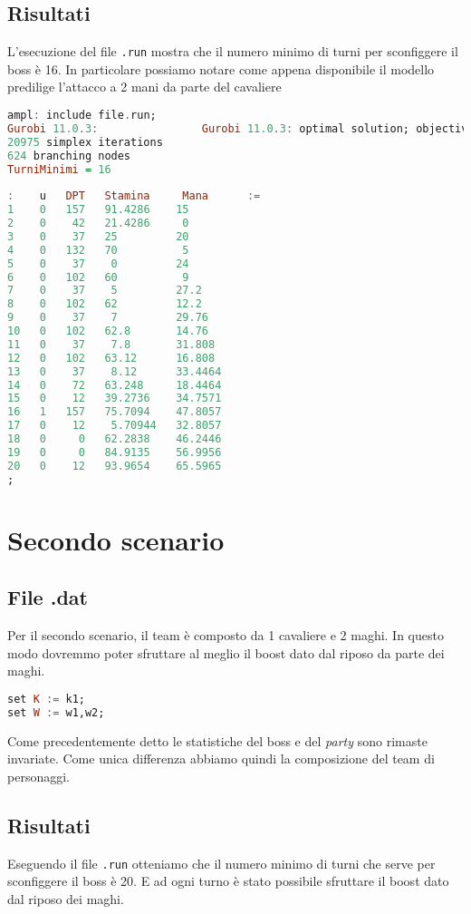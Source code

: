 \documentclass[12pt]{article}
\begin{document}
\subsection{Risultati}
L’esecuzione del file \texttt{.run} mostra che il numero minimo di turni per sconfiggere il boss è 16. In particolare possiamo notare come appena disponibile il modello predilige l'attacco a 2 mani da parte del cavaliere
\begin{lstlisting}[language=haskell, frame=single, captionpos=b, keywordstyle=\color{purple}]  
ampl: include file.run;
Gurobi 11.0.3:                Gurobi 11.0.3: optimal solution; objective 16
20975 simplex iterations
624 branching nodes
TurniMinimi = 16
    
:    u   DPT   Stamina     Mana      :=
1    0   157   91.4286    15
2    0    42   21.4286     0
3    0    37   25         20
4    0   132   70          5
5    0    37    0         24
6    0   102   60          9
7    0    37    5         27.2
8    0   102   62         12.2
9    0    37    7         29.76
10   0   102   62.8       14.76
11   0    37    7.8       31.808
12   0   102   63.12      16.808
13   0    37    8.12      33.4464
14   0    72   63.248     18.4464
15   0    12   39.2736    34.7571
16   1   157   75.7094    47.8057
17   0    12    5.70944   32.8057
18   0     0   62.2838    46.2446
19   0     0   84.9135    56.9956
20   0    12   93.9654    65.5965
;    
\end{lstlisting}
\newpage
\section{Secondo scenario}
\subsection{File .dat}
Per il secondo scenario, il team è composto da 1 cavaliere e 2 maghi. In questo modo dovremmo poter sfruttare al meglio il boost dato dal riposo da parte dei maghi.
\begin{lstlisting}[language=haskell, frame=single, captionpos=b, keywordstyle=\color{purple}]  
set K := k1;
set W := w1,w2;
\end{lstlisting}
Come precedentemente detto le statistiche del boss e del \textit{party} sono rimaste invariate. Come unica differenza abbiamo quindi la composizione del team di personaggi.
\subsection{Risultati}
Eseguendo il file \texttt{.run} otteniamo che il numero minimo di turni che serve per sconfiggere il boss è 20. E ad ogni turno è stato possibile sfruttare il boost dato dal riposo dei maghi.
\end{document}
